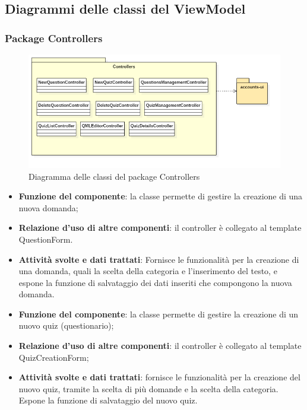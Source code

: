 \subsection{Diagrammi delle classi del ViewModel}
\subsubsection{Package Controllers}
\begin{figure}[h!]
	\begin{center}
		\includegraphics[scale=0.6]{../images/ControllersClass.png}
		\caption{Diagramma delle classi del package Controllers}
	\end{center}
\end{figure}


\begin{itemize}
	\item\textbf{Funzione del componente}: la classe permette di gestire la creazione di una nuova domanda;
	\item\textbf{Relazione d'uso di altre componenti}: il controller è collegato al template QuestionForm.
	\item\textbf{Attività svolte e dati trattati}: Fornisce le funzionalità per la creazione di una domanda, quali la scelta della categoria e l'inserimento del testo, e espone la funzione di salvataggio dei dati inseriti che compongono la nuova domanda.
\end{itemize}


\begin{itemize}
	\item\textbf{Funzione del componente}: la classe permette di gestire la creazione di un nuovo quiz (questionario); 
	\item\textbf{Relazione d'uso di altre componenti}: il controller è collegato al template QuizCreationForm;
	\item\textbf{Attività svolte e dati trattati}: fornisce le funzionalità per la creazione del nuovo quiz, tramite la scelta di più domande e la scelta della categoria. Espone la funzione di salvataggio del nuovo quiz.
\end{itemize}

